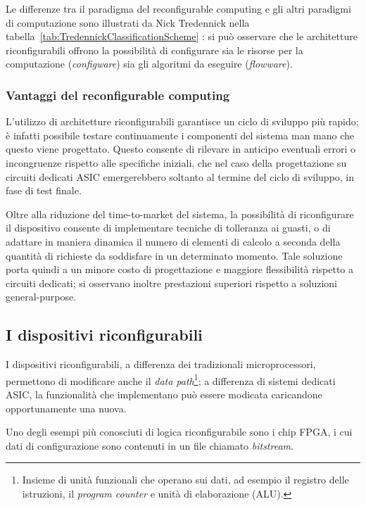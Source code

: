 Le differenze tra il paradigma del reconfigurable computing e gli altri paradigmi di
computazione sono illustrati da Nick Tredennick nella
tabella~\ref{tab:TredennickClassificationScheme} \cite{TredennickClassification}: si può
osservare che le architetture riconfigurabili offrono la possibilità di configurare sia le
risorse per la computazione (\emph{configware}) sia gli algoritmi da eseguire
(\emph{flowware}). 

\subsubsection{Vantaggi del reconfigurable computing}
L'utilizzo di architetture riconfigurabili garantisce un ciclo di sviluppo pi\`u rapido;
\`e infatti possibile testare continuamente i componenti del sistema man mano che questo viene
progettato. Questo consente di rilevare in anticipo eventuali errori o incongruenze rispetto alle
specifiche iniziali, che nel caso della progettazione su circuiti dedicati \ac{ASIC} emergerebbero
soltanto al termine del ciclo di sviluppo, in fase di test finale.

Oltre alla riduzione del time-to-market del sistema, la possibilit\`a di riconfigurare
il dispositivo consente di implementare tecniche di tolleranza ai guasti, o di adattare
in maniera dinamica il numero di elementi di calcolo a seconda della quantit\`a di richieste
da soddisfare in un determinato momento. Tale soluzione porta quindi a un minore costo di progettazione
e maggiore flessibilità rispetto a circuiti dedicati; si osservano inoltre prestazioni superiori
rispetto a soluzioni general-purpose.



\subsection{I dispositivi riconfigurabili}
I dispositivi riconfigurabili, a differenza dei tradizionali microprocessori, permettono di modificare
anche il \emph{data path}\footnote{Insieme di unit\`a funzionali che operano sui dati, ad esempio il
registro delle istruzioni, il \emph{program counter} e unit\`a di elaborazione (\acs{ALU}).};
a differenza di sistemi dedicati \ac{ASIC}, la funzionalit\`a che implementano pu\`o essere
modicata caricandone opportunamente una nuova.

Uno degli esempi pi\`u conosciuti di logica riconfigurabile sono i chip \ac{FPGA}, i cui dati di
configurazione sono contenuti in un file chiamato \emph{bitstream}.

